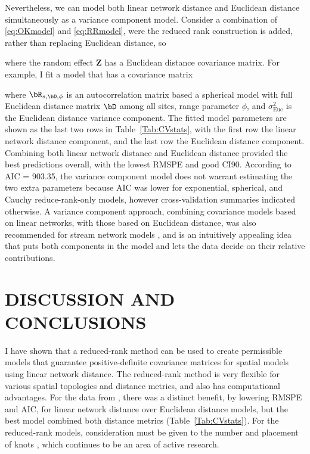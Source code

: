 Nevertheless, we can model both linear network distance and Euclidean distance simultaneously as a variance component model.  Consider a combination of \ref{eq:OKmodel} and \ref{eq:RRmodel}, were the reduced rank construction is added, rather than replacing Euclidean distance, so

where the random effect $\bm Z$ has a Euclidean distance covariance matrix. For example, I fit a model that has a covariance matrix

where $\bR_{s,\bD,\phi}$ is an autocorrelation matrix based a spherical model with full Euclidean distance matrix $\bD$ among all sites, range parameter $\phi$, and $\sigma^2_{\textrm{Euc}}$ is the Euclidean distance variance component. The fitted model parameters are shown as the last two rows in Table~\ref{Tab:CVstats}, with the first row the linear network distance component, and the last row the Euclidean distance component.  Combining both linear network distance and Euclidean distance provided the best predictions overall, with the lowest RMSPE and good CI90. According to AIC = 903.35, the variance component model does not warrant estimating the two extra parameters because AIC was lower for exponential, spherical, and Cauchy reduce-rank-only models, however cross-validation summaries indicated otherwise.  A variance component approach, combining covariance models based on linear networks, with those based on Euclidean distance, was also recommended for stream network models \citep{Ver:Pete:Move:2010}, and is an intuitively appealing idea that puts both components in the model and lets the data decide on their relative contributions.

\section*{DISCUSSION AND CONCLUSIONS}

I have shown that a reduced-rank method can be used to create permissible models that guarantee positive-definite covariance matrices for spatial models using linear network distance.  The reduced-rank method is very flexible for various spatial topologies and distance metrics, and also has computational advantages.  For the data from \citet{Ladl:Avga:Whea:Boyc:pred:2016}, there was a distinct benefit, by lowering RMSPE and AIC, for linear network distance over Euclidean distance models, but the best model combined both distance metrics (Table~\ref{Tab:CVstats}).  For the reduced-rank models, consideration must be given to the number and placement of knots \citep{Rupp:Wand:Carr:semi:2003, Gelf:Bane:Finl:spat:2012}, which continues to be an area of active research.

